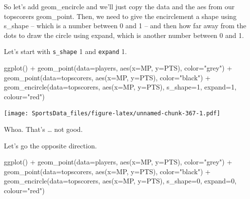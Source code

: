 \documentclass[
]{book}
\newenvironment{Shaded}{\begin{snugshade}}{\end{snugshade}}
\newcommand{\AttributeTok}[1]{\textcolor[rgb]{0.77,0.63,0.00}{#1}}
\newcommand{\DecValTok}[1]{\textcolor[rgb]{0.00,0.00,0.81}{#1}}
\newcommand{\FunctionTok}[1]{\textcolor[rgb]{0.00,0.00,0.00}{#1}}
\newcommand{\NormalTok}[1]{#1}
\newcommand{\SpecialCharTok}[1]{\textcolor[rgb]{0.00,0.00,0.00}{#1}}
\newcommand{\StringTok}[1]{\textcolor[rgb]{0.31,0.60,0.02}{#1}}
\begin{document}
So let's add geom\_encircle and we'll just copy the data and the aes from our topscorers geom\_point. Then, we need to give the encirclement a shape using s\_shape -- which is a number between 0 and 1 -- and then how far away from the dots to draw the circle using expand, which is another number between 0 and 1.

Let's start with \texttt{s\_shape} 1 and \texttt{expand} 1.

\begin{Shaded}
\begin{Highlighting}[]
\FunctionTok{ggplot}\NormalTok{() }\SpecialCharTok{+} 
  \FunctionTok{geom\_point}\NormalTok{(}\AttributeTok{data=}\NormalTok{players, }\FunctionTok{aes}\NormalTok{(}\AttributeTok{x=}\NormalTok{MP, }\AttributeTok{y=}\NormalTok{PTS), }\AttributeTok{color=}\StringTok{"grey"}\NormalTok{) }\SpecialCharTok{+} 
  \FunctionTok{geom\_point}\NormalTok{(}\AttributeTok{data=}\NormalTok{topscorers, }\FunctionTok{aes}\NormalTok{(}\AttributeTok{x=}\NormalTok{MP, }\AttributeTok{y=}\NormalTok{PTS), }\AttributeTok{color=}\StringTok{"black"}\NormalTok{) }\SpecialCharTok{+} 
  \FunctionTok{geom\_encircle}\NormalTok{(}\AttributeTok{data=}\NormalTok{topscorers, }\FunctionTok{aes}\NormalTok{(}\AttributeTok{x=}\NormalTok{MP, }\AttributeTok{y=}\NormalTok{PTS), }\AttributeTok{s\_shape=}\DecValTok{1}\NormalTok{, }\AttributeTok{expand=}\DecValTok{1}\NormalTok{, }\AttributeTok{colour=}\StringTok{"red"}\NormalTok{)}
\end{Highlighting}
\end{Shaded}

\texttt{[image: SportsData\_files/figure-latex/unnamed-chunk-367-1.pdf]}

Whoa. That's \ldots{} not good.

Let's go the opposite direction.

\begin{Shaded}
\begin{Highlighting}[]
\FunctionTok{ggplot}\NormalTok{() }\SpecialCharTok{+} 
  \FunctionTok{geom\_point}\NormalTok{(}\AttributeTok{data=}\NormalTok{players, }\FunctionTok{aes}\NormalTok{(}\AttributeTok{x=}\NormalTok{MP, }\AttributeTok{y=}\NormalTok{PTS), }\AttributeTok{color=}\StringTok{"grey"}\NormalTok{) }\SpecialCharTok{+} 
  \FunctionTok{geom\_point}\NormalTok{(}\AttributeTok{data=}\NormalTok{topscorers, }\FunctionTok{aes}\NormalTok{(}\AttributeTok{x=}\NormalTok{MP, }\AttributeTok{y=}\NormalTok{PTS), }\AttributeTok{color=}\StringTok{"black"}\NormalTok{) }\SpecialCharTok{+} 
  \FunctionTok{geom\_encircle}\NormalTok{(}\AttributeTok{data=}\NormalTok{topscorers, }\FunctionTok{aes}\NormalTok{(}\AttributeTok{x=}\NormalTok{MP, }\AttributeTok{y=}\NormalTok{PTS), }\AttributeTok{s\_shape=}\DecValTok{0}\NormalTok{, }\AttributeTok{expand=}\DecValTok{0}\NormalTok{, }\AttributeTok{colour=}\StringTok{"red"}\NormalTok{)}
\end{Highlighting}
\end{Shaded}
\end{document}
